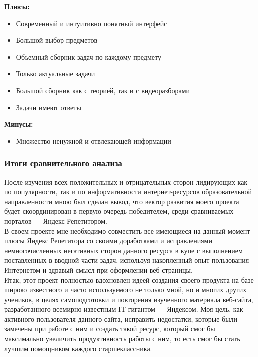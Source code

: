 \documentclass[a4paper, 12pt]{extarticle}
\begin{document}
\begin{enumerate}
    \textbf{Плюсы:}
    \vspace{-2mm}
    \begin{itemize}
        \item Современный и интуитивно понятный интерфейс
        \item Большой выбор предметов
        \item Объемный сборник задач по каждому предмету
        \item Только актуальные задачи
        \item Большой сборник как с теорией, так и с видеоразборами
        \item Задачи имеют ответы
    \end{itemize}
    \textbf{Минусы:}
    \vspace{-2mm}
    \begin{itemize}
        \item Множество ненужной и отвлекающей информации
    \end{itemize}
\end{enumerate}

\subsubsection{Итоги сравнительного анализа}
После изучения всех положительных и отрицательных сторон лидирующих как по
популярности, так и по информативности интернет-ресурсов образовательной
направленности мною был сделан вывод, что вектор развития моего проекта будет
скоординирован в первую очередь победителем, среди сравниваемых порталов —
Яндекс Репетитором.
\\

В своем проекте мне необходимо совместить все имеющиеся на данный момент плюсы
Яндекс Репетитора со своими доработками и исправлениями немногочисленных
негативных сторон данного ресурса в купе с выполнением поставленных в вводной
части задач, используя накопленный опыт пользования Интернетом и здравый смысл
при оформлении веб-страницы.
\\

Итак, этот проект полностью вдохновлен идеей создания своего продукта на базе
широко известного и часто используемого не только мной, но и многих других
учеников, в целях самоподготовки и повторения изученного материала веб-сайта,
разработанного всемирно известным IT-гигантом — Яндексом. Моя цель, как
активного пользователя данного сайта, исправить недостатки, которые были
замечены при работе с ним и создать такой ресурс, который смог бы максимально
увеличить продуктивность работы с ним, то есть смог бы стать лучшим помощником
каждого старшеклассника.
\newpage
\end{document}
